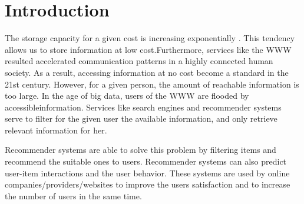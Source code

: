 \chapter{Introduction}
The storage capacity for a given cost is increasing exponentially \cite{wiki:krydr}.
This tendency allows us to store information at low cost.Furthermore, services like the WWW
resulted accelerated communication patterns in a highly connected human society. As a
result, accessing information at no cost become a standard in the 21st century. However,
for a given person, the amount of reachable information is too large. In the age of big
data, users of the WWW are flooded by accessibleinformation. Services like search engines
and recommender systems serve to filter for the given user the available information, and
only retrieve relevant information for her. 


Recommender systems are able to solve this problem by filtering items and recommend the 
suitable ones to users. Recommender systems can  also predict user-item interactions and
the  user behavior. These systems are used by online companies/providers/websites to improve the users satisfaction and to increase the number of users in the same time. 